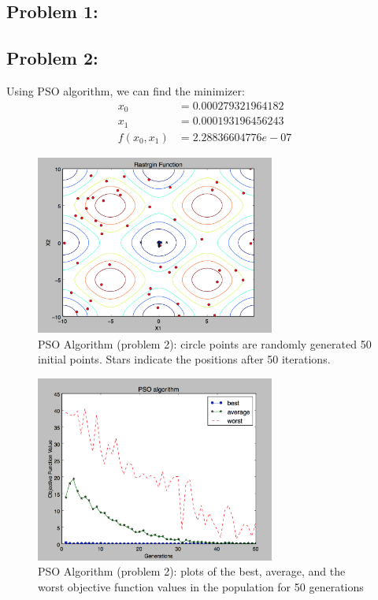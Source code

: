 \documentclass{article}
\begin{document}
 


\subsection*{{Problem 1: }}



\subsection*{{Problem 2: }}

Using PSO algorithm, we can find the minimizer: \\
\begin{align*}
x_0 & = 0.000279321964182 \\
x_1 & = 0.000193196456243 \\
f(x_0,x_1) & =  2.28836604776e-07
\end{align*}

\begin{figure}[h]
\includegraphics[width=0.7\textwidth]{PSO} 
\centering
\caption{PSO Algorithm (problem 2): circle points are randomly generated 50 initial points. Stars indicate the positions after 50 iterations. }

\end{figure}

\begin{figure}[h]
\includegraphics[width=0.7\textwidth]{PSO_min_best} 
\centering
\caption{PSO Algorithm (problem 2): plots of the best, average, and the worst objective function values in the population for 50 generations }

\end{figure}
\end{document}
